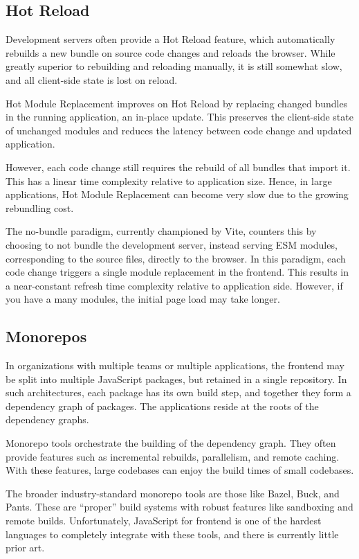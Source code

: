 \documentclass{article}
\begin{document}
\subsection{Hot Reload}

Development servers often provide a Hot Reload feature, which automatically rebuilds a new bundle on
source code changes and reloads the browser. While greatly superior to rebuilding and reloading
manually, it is still somewhat slow, and all client-side state is lost on reload.

Hot Module Replacement improves on Hot Reload by replacing changed bundles in the running
application, an in-place update. This preserves the client-side state of unchanged modules and
reduces the latency between code change and updated application.

However, each code change still requires the rebuild of all bundles that import it. This has a
linear time complexity relative to application size. Hence, in large applications, Hot Module
Replacement can become very slow due to the growing rebundling cost.

The no-bundle paradigm, currently championed by Vite, counters this by choosing to not bundle the
development server, instead serving ESM modules, corresponding to the source files, directly to the
browser. In this paradigm, each code change triggers a single module replacement in the frontend.
This results in a near-constant refresh time complexity relative to application side. However, if
you have a many modules, the initial page load may take longer.

\subsection{Monorepos}

In organizations with multiple teams or multiple applications, the frontend may be split into
multiple JavaScript packages, but retained in a single repository. In such architectures, each
package has its own build step, and together they form a dependency graph of packages. The
applications reside at the roots of the dependency graphs.

Monorepo tools orchestrate the building of the dependency graph. They often provide features such as
incremental rebuilds, parallelism, and remote caching. With these features, large codebases can
enjoy the build times of small codebases.

The broader industry-standard monorepo tools are those like Bazel, Buck, and Pants. These are
``proper'' build systems with robust features like sandboxing and remote builds. Unfortunately,
JavaScript for frontend is one of the hardest languages to completely integrate with these tools,
and there is currently little prior art.
\end{document}
